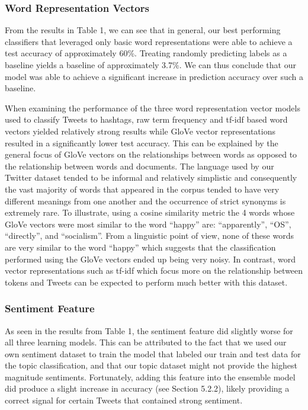 \documentclass[11pt]{article}
\begin{document}
\subsubsection{Word Representation Vectors}
From the results in Table 1, we can see that in general, our best performing classifiers that leveraged only basic word representations were able to achieve a test accuracy of approximately 60\%. Treating randomly predicting labels as a baseline yields a baseline of approximately 3.7\%. We can thus conclude that our model was able to achieve a significant increase in prediction accuracy over such a baseline.

When examining the performance of the three word representation vector models used to classify Tweets to hashtags, raw term frequency and tf-idf based word vectors yielded relatively strong results while GloVe vector representations resulted in a significantly lower test accuracy. This can be explained by the general focus of GloVe vectors on the relationships between words as opposed to the relationship between words and documents. The language used by our Twitter dataset tended to be informal and relatively simplistic and consequently the vast majority of words that appeared in the corpus tended to have very different meanings from one another and the occurrence of strict synonyms is extremely rare. To illustrate, using a cosine similarity metric the 4 words whose GloVe vectors were most similar to the word ``happy'' are: ``apparently'', ``OS'', ``directly'', and ``socialism''. From a linguistic point of view, none of these words are very similar to the word ``happy'' which suggests that the classification performed using the GloVe vectors ended up being very noisy. In contrast, word vector representations such as tf-idf which focus more on the relationship between tokens and Tweets can be expected to perform much better with this dataset.

\subsubsection{Sentiment Feature}

As seen in the results from Table 1, the sentiment feature did slightly worse for all three learning models. This can be attributed to the fact that we used our own sentiment dataset to train the model that labeled our train and test data for the topic classification, and that our topic dataset might not provide the highest magnitude sentiments. Fortunately, adding this feature into the ensemble model did produce a slight increase in accuracy (see Section 5.2.2), likely  providing a correct signal for certain Tweets that contained strong sentiment.
\end{document}
